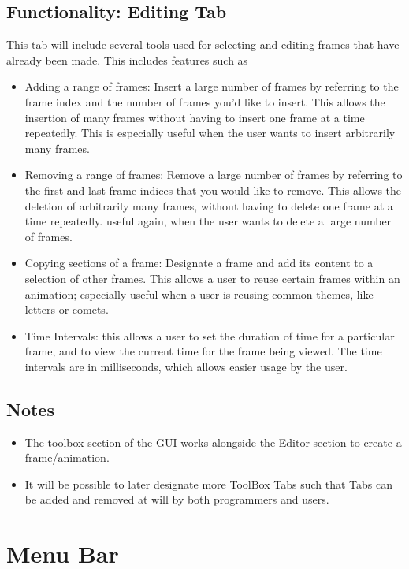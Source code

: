 \documentclass[12pt]{extarticle}
\begin{document}
	\subsection{Functionality: Editing Tab}
	This tab will include several tools used for selecting and editing frames that have already been made. This includes features such as
	\begin{itemize}
			\item Adding a range of frames: Insert a large number of frames by referring to the frame index and the number of frames you'd like to insert.  This allows the insertion of many frames without having to insert one frame at a time repeatedly.  This is especially useful when the user wants to insert arbitrarily many frames.
			\item Removing a range of frames: Remove a large number of frames by referring to the first and last frame indices that you would like to remove.  This allows the deletion of arbitrarily many frames, without having to delete one frame at a time repeatedly.  useful again, when the user wants to delete a large number of frames.
			\item Copying sections of a frame: Designate a frame and add its content to a selection of other frames.  This allows a user to reuse certain frames within an animation; especially useful when a user is reusing common themes, like letters or comets.
			\item Time Intervals: this allows a user to set the duration of time for a particular frame, and to view the current time for the frame being viewed.  The time intervals are in milliseconds, which allows easier usage by the user.
	\end{itemize}
	
	\subsection{Notes}
	\begin{itemize}
		\item The toolbox section of the GUI works alongside the Editor section to create a frame/animation. 

		\item It will be possible to later designate more ToolBox Tabs such that Tabs can be added and removed at will by both programmers and users.
	\end{itemize}


\clearpage
\section{Menu Bar}
\end{document}

